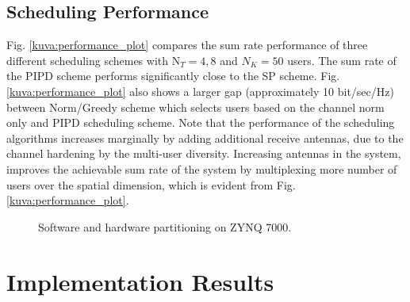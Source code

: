 \documentclass[conference,letterpaper,10pt]{./../../IEEE/IEEEtran}
\begin{document}
\subsection{Scheduling Performance}
Fig. \ref{kuva:performance_plot} compares the sum rate performance of three different scheduling schemes with $\textrm{N}_T = 4,8$ and $N_K = 50$ users. The sum rate of the PIPD scheme performs significantly close to the SP scheme. Fig. \ref{kuva:performance_plot} also shows a larger gap (approximately 10 bit/sec/Hz) between Norm/Greedy scheme which selects users based on the channel norm only and PIPD scheduling scheme. Note that the performance of the scheduling algorithms increases marginally by adding additional receive antennas, due to the channel hardening by the multi-user diversity. Increasing  antennas in the system, improves the achievable sum rate of the system by multiplexing more number of users over the spatial dimension, which is evident from Fig. \ref{kuva:performance_plot}.
\begin{figure}
	\centering
	\caption{Software and hardware partitioning on ZYNQ 7000.}
	\label{kuva:block_diag}
\end{figure}

\section{Implementation Results}
\label{sec:implementation}
\end{document}
